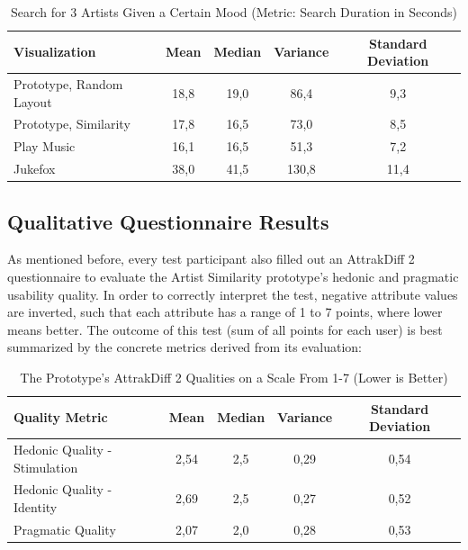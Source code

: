 \begin{table}[H]
\begin{center}
\begin{tabular}{ | l | c | c | c | c |}
	\hline
	\textbf{Visualization} & \textbf{Mean} & \textbf{Median} & \textbf{Variance} & \textbf{Standard Deviation}\\ \hline
	Prototype, Random Layout & 18,8 & 19,0 & 86,4 & 9,3 \\ \hline
	Prototype, Similarity & 17,8 & 16,5 & 73,0 & 8,5 \\ \hline
	Play Music & 16,1 & 16,5 & 51,3 & 7,2 \\ \hline
	Jukefox & 38,0 & 41,5 & 130,8 & 11,4 \\ \hline
\end{tabular}
\caption {Search for 3 Artists Given a Certain Mood (Metric: Search Duration in Seconds)} \label{tab:search-mood} 
\end{center}
\end{table}


\subsection{Qualitative Questionnaire Results}
\label{sec:qualitative-questionnaire-results}

As mentioned before, every test participant also filled out an AttrakDiff 2 questionnaire to evaluate the Artist Similarity prototype's hedonic and pragmatic usability quality. In order to correctly interpret the test, negative attribute values are inverted, such that each attribute has a range of 1 to 7 points, where lower means better. The outcome of this test (sum of all points for each user) is best summarized by the concrete metrics derived from its evaluation:

\begin{table}[H]
\begin{center}
\begin{tabular}{ | l | c | c | c | c |}
	\hline
	\textbf{Quality Metric} & \textbf{Mean} & \textbf{Median} & \textbf{Variance} & \textbf{Standard Deviation}\\ \hline
	Hedonic Quality - Stimulation & 2,54 & 2,5 & 0,29 & 0,54 \\ \hline
	Hedonic Quality - Identity & 2,69 & 2,5 & 0,27 & 0,52 \\ \hline
	Pragmatic Quality & 2,07 & 2,0 & 0,28 & 0,53 \\ \hline
\end{tabular}
\caption {The Prototype's AttrakDiff 2 Qualities on a Scale From 1-7 (Lower is Better)} \label{tab:attrakdiff} 
\end{center}
\end{table}

